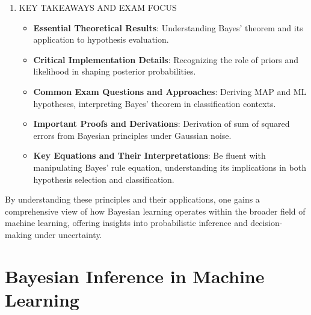 \documentclass[
  12pt,
]{report}
\providecommand{\tightlist}{%
  \setlength{\itemsep}{0pt}\setlength{\parskip}{0pt}}
\begin{document}
\begin{enumerate}
  \begin{itemize}
  \tightlist
  \item
    \textbf{Example}: Identifying the presence of a disease based on test results and prior probabilities, illustrating the importance of priors.
  \item
    \textbf{Implementation Variations}: Can vary based on assumptions about the noise model (e.g., Gaussian) and the form of data likelihood.
  \item
    \textbf{Performance Comparisons}: Bayesian methods typically provide a robust framework for uncertainty estimation and probabilistic inference.
  \item
    \textbf{Limitations}: Computationally expensive for large hypothesis spaces; sensitive to choice of priors and likelihood models.
  \end{itemize}
\item
  KEY TAKEAWAYS AND EXAM FOCUS

  \begin{itemize}
  \tightlist
  \item
    \textbf{Essential Theoretical Results}: Understanding Bayes' theorem and its application to hypothesis evaluation.
  \item
    \textbf{Critical Implementation Details}: Recognizing the role of priors and likelihood in shaping posterior probabilities.
  \item
    \textbf{Common Exam Questions and Approaches}: Deriving MAP and ML hypotheses, interpreting Bayes' theorem in classification contexts.
  \item
    \textbf{Important Proofs and Derivations}: Derivation of sum of squared errors from Bayesian principles under Gaussian noise.
  \item
    \textbf{Key Equations and Their Interpretations}: Be fluent with manipulating Bayes' rule equation, understanding its implications in both hypothesis selection and classification.
  \end{itemize}
\end{enumerate}

By understanding these principles and their applications, one gains a comprehensive view of how Bayesian learning operates within the broader field of machine learning, offering insights into probabilistic inference and decision-making under uncertainty.

\chapter{Bayesian Inference in Machine Learning}
\end{document}
